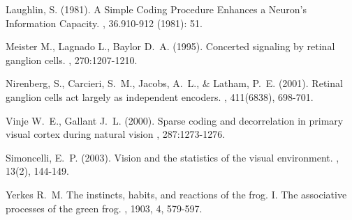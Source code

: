 \documentclass[twoside]{article}
\begin{document}
\begin{multicols}{2}
\begin{thebibliography}{99}
Laughlin, S. (1981).
\newblock A Simple Coding Procedure Enhances a Neuron's Information Capacity.
, 36.910-912 (1981): 51.

\bibitem[Meister et. al., 1995]
Meister M., Lagnado L., Baylor D.~A. (1995). 
\newblock Concerted signaling by retinal ganglion cells. 
, 270:1207-1210.

Nirenberg, S., Carcieri, S.~M., Jacobs, A.~L., \& Latham, P.~E. (2001).
\newblock Retinal ganglion cells act largely as independent encoders.
, 411(6838), 698-701.

\bibitem[Vinje 2000]
Vinje W.~E., Gallant J.~L. (2000).
\newblock Sparse coding and decorrelation in primary visual cortex during natural vision
, 287:1273-1276.

Simoncelli, E.~P. (2003).
\newblock  Vision and the statistics of the visual environment.
, 13(2), 144-149.

\bibitem[Yekes 1903]
Yerkes R.~M. 
\newblock The instincts, habits, and reactions of the frog. I. The associative processes of the green frog.
, 1903, 4, 579-597.
 
\end{thebibliography}



\end{multicols}
\end{document}
